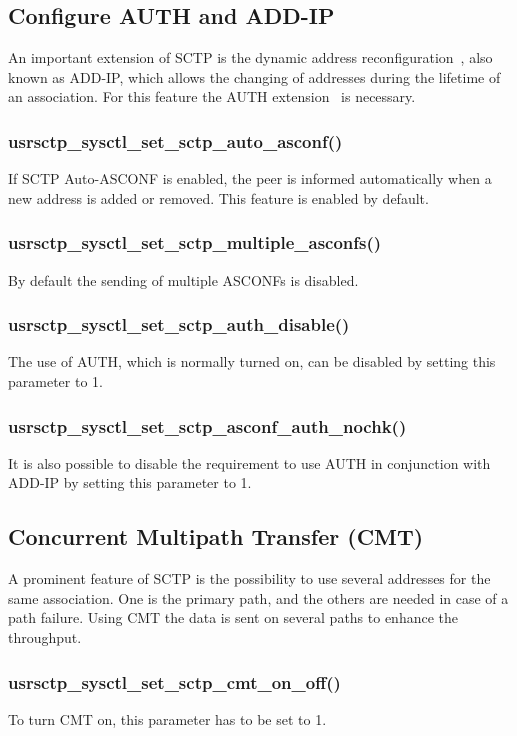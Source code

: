 \documentclass[a4paper]{article}
\begin{document}
\subsection{Configure AUTH and ADD-IP}
An important extension of SCTP is the dynamic address reconfiguration~\cite{addip}, also known as
ADD-IP, which allows the changing of addresses during the lifetime of an association.
For this feature the AUTH extension~\cite{auth} is necessary.

\subsubsection{usrsctp\_sysctl\_set\_sctp\_auto\_asconf()}
If SCTP Auto-ASCONF is enabled, the peer is informed automatically when a new address
is added or removed. This feature is enabled by default.

\subsubsection{usrsctp\_sysctl\_set\_sctp\_multiple\_asconfs()}
By default the sending of multiple ASCONFs is disabled.

\subsubsection{usrsctp\_sysctl\_set\_sctp\_auth\_disable()}
The use of AUTH, which is normally turned on, can be disabled by setting this parameter to 1.

\subsubsection{usrsctp\_sysctl\_set\_sctp\_asconf\_auth\_nochk()}
It is also possible to disable the requirement to use AUTH in conjunction with ADD-IP by setting this parameter
to 1.


\subsection{Concurrent Multipath Transfer (CMT)}
A prominent feature of SCTP is the possibility to use several addresses for the same association.
One is the primary path, and the others are needed in case of a path failure. Using CMT the data is sent 
on several paths to enhance the throughput.

\subsubsection{usrsctp\_sysctl\_set\_sctp\_cmt\_on\_off()}
To turn CMT on, this parameter has to be set to 1.
\end{document}
